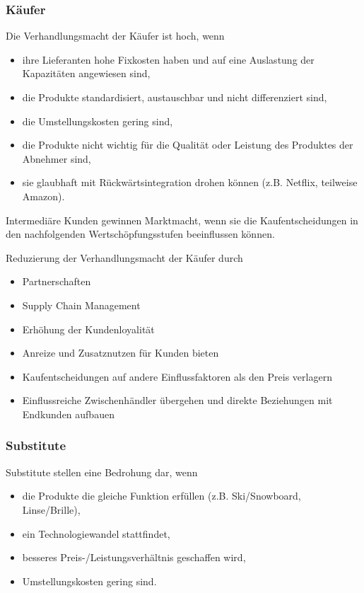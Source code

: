 \subsubsection{Käufer}
Die Verhandlungsmacht der Käufer ist hoch, wenn
\begin{itemize}
	\item ihre Lieferanten hohe Fixkosten haben und auf eine Auslastung der Kapazitäten angewiesen sind,
	\item die Produkte standardisiert, austauschbar und nicht differenziert sind,
	\item die Umstellungskosten gering sind,
	\item die Produkte nicht wichtig für die Qualität oder Leistung des Produktes der Abnehmer sind,
	\item sie glaubhaft mit Rückwärtsintegration drohen können (z.B. Netflix, teilweise Amazon).
\end{itemize}
Intermediäre Kunden gewinnen Marktmacht, wenn sie die Kaufentscheidungen in den nachfolgenden Wertschöpfungsstufen beeinflussen können.

Reduzierung der Verhandlungsmacht der Käufer durch
\begin{itemize}
	\item Partnerschaften
	\item Supply Chain Management
	\item Erhöhung der Kundenloyalität
	\item Anreize und Zusatznutzen für Kunden bieten
	\item Kaufentscheidungen auf andere Einflussfaktoren als den Preis verlagern
	\item Einflussreiche Zwischenhändler übergehen und direkte Beziehungen mit Endkunden aufbauen
\end{itemize}

\subsubsection{Substitute}
Substitute stellen eine Bedrohung dar, wenn
\begin{itemize}
	\item die Produkte die gleiche Funktion erfüllen (z.B. Ski/Snowboard, Linse/Brille),
	\item ein Technologiewandel stattfindet,
	\item besseres Preis-/Leistungsverhältnis geschaffen wird,
	\item Umstellungskosten gering sind.
\end{itemize}

